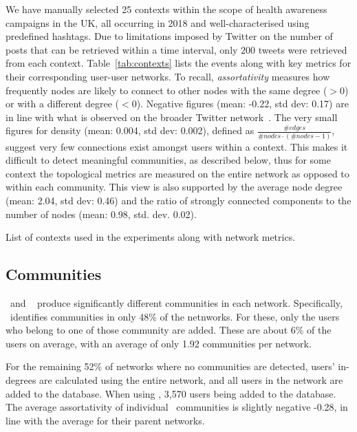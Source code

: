 We have manually selected 25 contexts within the scope of health awareness campaigns in the UK, all occurring in 2018 and well-characterised using predefined hashtags.
Due to limitations imposed by Twitter on the number of posts that can be retrieved within a time interval, only $200$ tweets were retrieved from each context.
 Table~\ref{tab:contexts} lists the events along with key metrics for their corresponding user-user networks. 
To recall, \textit{assortativity} measures how frequently nodes are likely to connect to other nodes with the same degree ($>0$) or with a different degree ($<0$). 
Negative figures (mean: -0.22, std dev: 0.17) are in line with what is observed on the broader Twitter network~\cite{Fisher2017}.
%
The very small figures for density (mean: 0.004, std dev: 0.002), defined as $\frac{\#edges }{\mathit{\mathit{\#nodes}} \cdot (\mathit{\#nodes} -1)}$, suggest very few connections exist amongst users within a context. 
This makes it difficult to detect meaningful communities, as described below, thus for some context the topological metrics are measured on the entire network as opposed to within each community.
This view is also supported by the average node degree (mean: 2.04, std dev: 0.46) and the ratio of strongly connected components to the number of nodes (mean: 0.98, std. dev. 0.02).

\begin{table}
	\resizebox{\textwidth}{!}{
	    
	}
	\caption{List of contexts used in the experiments along with network metrics.}
	\label{tab:contexts}
\end{table}

\subsection{Communities}  \label{sec:communities}

 \demon~and \infomap~ produce significantly different communities in each network. 
%
Specifically, \demon~identifies communities in only 48\% of the netnworks.
For these, only the users who belong to one of those community are added. 
These are about 6\% of the users on average, with an average of only 1.92 communities per network.

For the remaining 52\% of networks where no communities are detected, users' in-degrees are calculated using the entire network, and all users in the network are added to the database.
%
When using \demon, 3,570 users being added to the database.
The average assortativity of individual \demon~communities is slightly negative -0.28, in line with the average for their parent networks.

